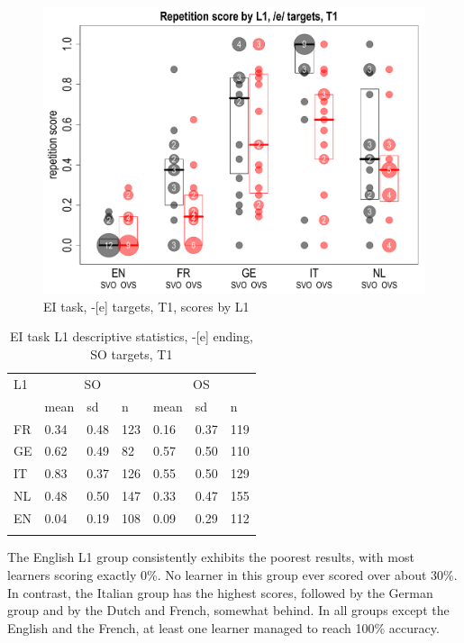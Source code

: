 \begin{figure}
    \includegraphics[width=\textwidth]{figures/04-1.pdf}
    \caption{EI task, -[e] targets, T1, scores by L1}
    \label{fig:04:1}
\end{figure}

\begin{table}
    \begin{tabularx}{\textwidth}{XXXXXXX}
    \lsptoprule
    L1 & \multicolumn{3}{c}{ SO} & \multicolumn{3}{c}{ OS}\\
    & mean & sd & n & mean & sd & n\\
    \cmidrule{2-7}
    FR & 0.34 & 0.48 & 123 & 0.16 & 0.37 & 119\\
    GE & 0.62 & 0.49 & 82 & 0.57 & 0.50 & 110\\
    IT & 0.83 & 0.37 & 126 & 0.55 & 0.50 & 129\\
    NL & 0.48 & 0.50 & 147 & 0.33 & 0.47 & 155\\
    EN & 0.04 & 0.19 & 108 & 0.09 & 0.29 & 112\\
    \lspbottomrule
    \end{tabularx}
    \caption{EI task L1 descriptive statistics, -[e] ending, SO targets, T1}
    \label{tab:04:1}
    \label{tab:03:1}
\end{table}

The English L1 group consistently exhibits the poorest results, with most learners scoring exactly 0\%. No learner in this group ever scored over about 30\%. In contrast, the Italian group has the highest scores, followed by the German group and by the Dutch and French, somewhat behind. In all groups except the English and the French, at least one learner managed to reach 100\% accuracy. 

